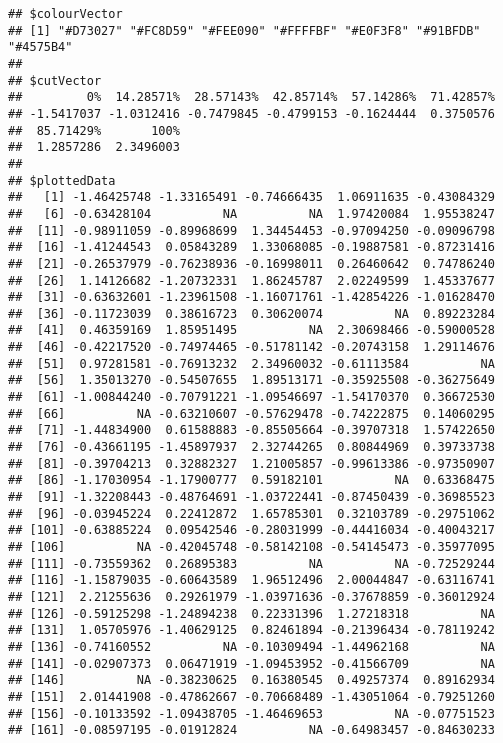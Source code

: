 \documentclass[]{article}
\begin{document}
\begin{verbatim}
## $colourVector
## [1] "#D73027" "#FC8D59" "#FEE090" "#FFFFBF" "#E0F3F8" "#91BFDB" "#4575B4"
## 
## $cutVector
##         0%  14.28571%  28.57143%  42.85714%  57.14286%  71.42857% 
## -1.5417037 -1.0312416 -0.7479845 -0.4799153 -0.1624444  0.3750576 
##  85.71429%       100% 
##  1.2857286  2.3496003 
## 
## $plottedData
##   [1] -1.46425748 -1.33165491 -0.74666435  1.06911635 -0.43084329
##   [6] -0.63428104          NA          NA  1.97420084  1.95538247
##  [11] -0.98911059 -0.89968699  1.34454453 -0.97094250 -0.09096798
##  [16] -1.41244543  0.05843289  1.33068085 -0.19887581 -0.87231416
##  [21] -0.26537979 -0.76238936 -0.16998011  0.26460642  0.74786240
##  [26]  1.14126682 -1.20732331  1.86245787  2.02249599  1.45337677
##  [31] -0.63632601 -1.23961508 -1.16071761 -1.42854226 -1.01628470
##  [36] -0.11723039  0.38616723  0.30620074          NA  0.89223284
##  [41]  0.46359169  1.85951495          NA  2.30698466 -0.59000528
##  [46] -0.42217520 -0.74974465 -0.51781142 -0.20743158  1.29114676
##  [51]  0.97281581 -0.76913232  2.34960032 -0.61113584          NA
##  [56]  1.35013270 -0.54507655  1.89513171 -0.35925508 -0.36275649
##  [61] -1.00844240 -0.70791221 -1.09546697 -1.54170370  0.36672530
##  [66]          NA -0.63210607 -0.57629478 -0.74222875  0.14060295
##  [71] -1.44834900  0.61588883 -0.85505664 -0.39707318  1.57422650
##  [76] -0.43661195 -1.45897937  2.32744265  0.80844969  0.39733738
##  [81] -0.39704213  0.32882327  1.21005857 -0.99613386 -0.97350907
##  [86] -1.17030954 -1.17900777  0.59182101          NA  0.63368475
##  [91] -1.32208443 -0.48764691 -1.03722441 -0.87450439 -0.36985523
##  [96] -0.03945224  0.22412872  1.65785301  0.32103789 -0.29751062
## [101] -0.63885224  0.09542546 -0.28031999 -0.44416034 -0.40043217
## [106]          NA -0.42045748 -0.58142108 -0.54145473 -0.35977095
## [111] -0.73559362  0.26895383          NA          NA -0.72529244
## [116] -1.15879035 -0.60643589  1.96512496  2.00044847 -0.63116741
## [121]  2.21255636  0.29261979 -1.03971636 -0.37678859 -0.36012924
## [126] -0.59125298 -1.24894238  0.22331396  1.27218318          NA
## [131]  1.05705976 -1.40629125  0.82461894 -0.21396434 -0.78119242
## [136] -0.74160552          NA -0.10309494 -1.44962168          NA
## [141] -0.02907373  0.06471919 -1.09453952 -0.41566709          NA
## [146]          NA -0.38230625  0.16380545  0.49257374  0.89162934
## [151]  2.01441908 -0.47862667 -0.70668489 -1.43051064 -0.79251260
## [156] -0.10133592 -1.09438705 -1.46469653          NA -0.07751523
## [161] -0.08597195 -0.01912824          NA -0.64983457 -0.84630233

\end{verbatim}
\end{document}
